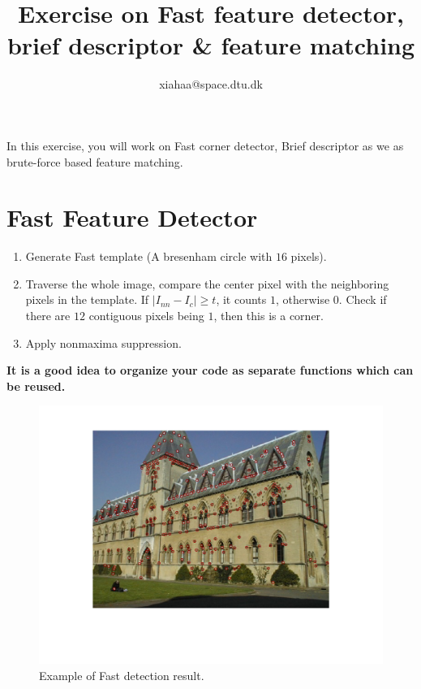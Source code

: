 \documentclass[a4paper]{article}
\begin{document}
\title{Exercise on Fast feature detector, brief descriptor \& feature matching}
\author{xiahaa@space.dtu.dk}
\maketitle%

In this exercise, you will work on Fast corner detector, Brief descriptor as we as brute-force based feature matching.

\section{Fast Feature Detector}
\begin{enumerate}
\item Generate Fast template (A bresenham circle with $16$ pixels).
\item Traverse the whole image, compare the center pixel with the neighboring pixels in the template. If $|I_{nn}-I_{c}| \geq t$, it counts $1$, otherwise $0$. Check if there are $12$ contiguous pixels being $1$, then this is a corner.
\item Apply nonmaxima suppression.
\end{enumerate}

\textbf{It is a good idea to organize your code as separate functions which can be reused.}

\begin{figure}[!b]
\centering
\includegraphics[scale=0.3]{figures/fastc.png}
\caption{Example of Fast detection result.}
\end{figure}
\end{document}

